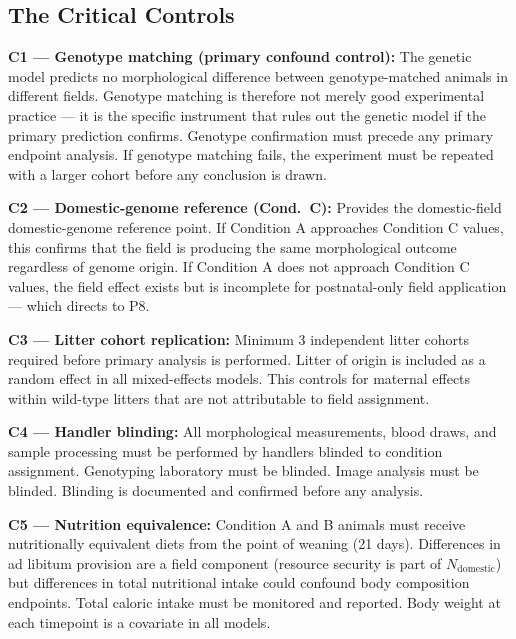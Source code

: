 \documentclass[10pt, a4paper]{article}
\begin{document}
\subsection{The Critical Controls}

\begin{mdframed}[
  backgroundcolor=controlbox,
  linecolor=headergreen,
  linewidth=0.8pt,
  innertopmargin=0.5em,
  innerbottommargin=0.5em,
  innerleftmargin=0.8em,
  innerrightmargin=0.8em
]
\textbf{C1 --- Genotype matching (primary confound
control):}
The genetic model predicts no morphological
difference between genotype-matched animals in
different fields. Genotype matching is therefore
not merely good experimental practice --- it is
the specific instrument that rules out the
genetic model if the primary prediction confirms.
Genotype confirmation must precede any primary
endpoint analysis. If genotype matching fails,
the experiment must be repeated with a larger
cohort before any conclusion is drawn.

\medskip
\textbf{C2 --- Domestic-genome reference (Cond.\ C):}
Provides the domestic-field domestic-genome
reference point. If Condition A approaches
Condition C values, this confirms that the
field is producing the same morphological
outcome regardless of genome origin.
If Condition A does not approach Condition C
values, the field effect exists but is
incomplete for postnatal-only field application
--- which directs to P8.

\medskip
\textbf{C3 --- Litter cohort replication:}
Minimum 3 independent litter cohorts required
before primary analysis is performed.
Litter of origin is included as a random effect
in all mixed-effects models. This controls for
maternal effects within wild-type litters that
are not attributable to field assignment.

\medskip
\textbf{C4 --- Handler blinding:}
All morphological measurements, blood draws,
and sample processing must be performed by
handlers blinded to condition assignment.
Genotyping laboratory must be blinded.
Image analysis must be blinded.
Blinding is documented and confirmed
before any analysis.

\medskip
\textbf{C5 --- Nutrition equivalence:}
Condition A and B animals must receive
nutritionally equivalent diets from the
point of weaning (21 days). Differences
in ad libitum provision are a field component
(resource security is part of $N_{\text{domestic}}$)
but differences in total nutritional intake
could confound body composition endpoints.
Total caloric intake must be monitored and
reported. Body weight at each timepoint is
a covariate in all models.
\end{mdframed}
\end{document}
